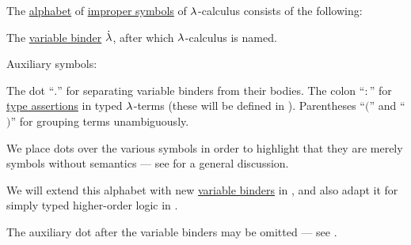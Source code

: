 \begin{definition}\label{def:lambda_term_alphabet}\mimprovised
  The \hyperref[def:formal_language/alphabet]{alphabet} of \hyperref[con:improper_symbol]{improper symbols} of \( {\mathrm \lambda} \)-calculus consists of the following:

  \begin{thmenum}
     The \hyperref[con:variable_binding]{variable binder} \( \mathord{\dot{{\mathrm \lambda}}} \), after which \( {\mathrm \lambda} \)-calculus is named.

     Auxiliary symbols:
    \begin{thmenum}
       The dot \enquote{\( . \)} for separating variable binders from their bodies.
       The colon \enquote{\( : \)} for \hyperref[def:type_assertion]{type assertions} in typed \( {\mathrm \lambda} \)-terms (these will be defined in ).
       Parentheses \enquote{\( ( \)} and \enquote{\( ) \)} for grouping terms unambiguously.
    \end{thmenum}
  \end{thmenum}
\end{definition}
\begin{comments}
  \item We place dots over the various symbols in order to highlight that they are merely symbols without semantics --- see  for a general discussion.

  \item We will extend this alphabet with new \hyperref[con:variable_binding]{variable binders} in , and also adapt it for simply typed higher-order logic in .

  \item The auxiliary dot after the variable binders may be omitted --- see .
\end{comments}

